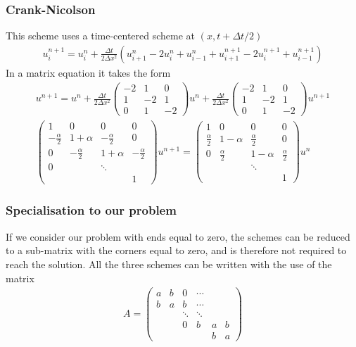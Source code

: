 \documentclass[11pt,a4paper,draft]{article}
\numberwithin{equation}{section}
\begin{document}
\subsubsection{Crank-Nicolson}
This scheme uses a time-centered scheme at $(x,t+\Delta t/2)$
\begin{gather}
u_i^{n+1} = u_i^n + \frac{\Delta t}{2\Delta x^2}\left(
u_{i+1}^n - 2u_i^n + u_{i-1}^n + u_{i+1}^{n+1} - 2u_i^{n+1} + u_{i-1}^{n+1}
\right)
\end{gather}
In a matrix equation it takes the form
\begin{gather}
u^{n+1} = u^n + \frac{\Delta t}{2\Delta x^2}
\begin{pmatrix}
-2 & 1 & 0\\
1 & -2 & 1\\
0 & 1 & -2
\end{pmatrix} u^n
 + \frac{\Delta t}{2\Delta x^2}
\begin{pmatrix}
-2 & 1 & 0\\
1 & -2 & 1\\
0 & 1 & -2
\end{pmatrix}u^{n+1}\\
\begin{pmatrix}
1 & 0 & 0 & 0\\
-\frac{\alpha}{2} & 1 + \alpha & -\frac{\alpha}{2} & 0\\
0 & -\frac{\alpha}{2} & 1 + \alpha & -\frac{\alpha}{2}\\
0 & & \ddots\\
&&& 1
\end{pmatrix}
u^{n+1} = 
\begin{pmatrix}
1 & 0 & 0 & 0\\
\frac{\alpha}{2} & 1 - \alpha & \frac{\alpha}{2} &  0\\
0 & \frac{\alpha}{2} & 1 - \alpha & \frac{\alpha}{2}\\
&& \ddots\\
&&&1
\end{pmatrix}u^n
\end{gather}


\subsubsection{Specialisation to our problem}

If we consider our problem with ends equal to zero, the schemes can 
be reduced to a sub-matrix with the corners equal to zero, and is therefore
not required to reach the solution. All the three schemes can be written 
with the use of the matrix
\begin{gather}
A = 
\begin{pmatrix}
a & b & 0 & \cdots\\
b & a & b & \cdots\\
&&\ddots & \ddots\\
&&0& b& a & b\\
&&&&b&a
\end{pmatrix}
\label{eq:matrixA}
\end{gather}
\end{document}
